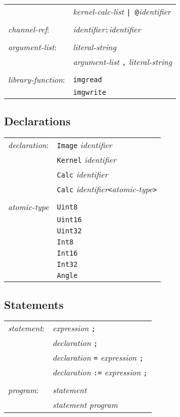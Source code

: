 \begin{center}
\begin{tabular}{l l}
& \emph{kernel-calc-list} \texttt{| @}\emph{identifier}\\
\\
\emph{channel-ref}: & \emph{identifier}\texttt{:}\emph{identifier}\\
\\
\emph{argument-list}: & \emph{literal-string}\\
& \emph{argument-list} \texttt{,} \emph{literal-string}\\
\\
\emph{library-function}: & \texttt{imgread}\\
& \texttt{imgwrite}\\
\end{tabular}\end{center}

\subsection{Declarations}

\begin{center}\begin{tabular}{l l}
\emph{declaration}: & \texttt{Image} \emph{identifier}\\
& \texttt{Kernel} \emph{identifier}\\
& \texttt{Calc} \emph{identifier}\\
& \texttt{Calc} \emph{identifier}\texttt{<}\emph{atomic-type}\texttt{>}\\
\\
\emph{atomic-type} & \texttt{Uint8}\\
& \texttt{Uint16}\\
& \texttt{Uint32}\\
& \texttt{Int8}\\
& \texttt{Int16}\\
& \texttt{Int32}\\
& \texttt{Angle}\\
\end{tabular}\end{center}


\subsection{Statements}

\begin{center}\begin{tabular}{l l}
\emph{statement}: & \emph{expression} \texttt{;}\\
& \emph{declaration} \texttt{;}\\
& \emph{declaration} \texttt{=} \emph{expression} \texttt{;}\\
& \emph{declaration} \texttt{:=} \emph{expression} \texttt{;}\\
\\
\emph{program}: & \emph{statement}\\
& \emph{statement} \emph{program}\\
\end{tabular}\end{center}


